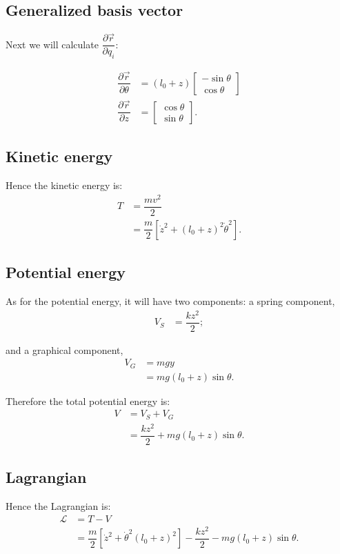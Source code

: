 \documentclass[12pt,a4paper,portrait]{article}
\begin{document}
\subsection{Generalized basis vector}
Next we will calculate $\dfrac{\partial \vec{r}}{\partial q_i}$:

\begin{align*}
	\dfrac{\partial \vec{r}}{\partial \theta} &= (l_0+z)\begin{bmatrix}
		-\sin{\theta} \\
		\cos{\theta}
	\end{bmatrix} \\
	\dfrac{\partial \vec{r}}{\partial z} &= \begin{bmatrix}
		\cos{\theta} \\
		\sin{\theta}
	\end{bmatrix}.
\end{align*}

\subsection{Kinetic energy}
Hence the kinetic energy is:
\begin{align*}
	T &= \dfrac{mv^2}{2} \\
	&= \dfrac{m}{2} \left[\dot{z}^2 + (l_0+z)^2\dot{\theta}^2\right].
\end{align*}

\subsection{Potential energy}
As for the potential energy, it will have two components: a spring component,
\begin{align*}
	V_S &= \dfrac{kz^2}{2};
\end{align*}

and a graphical component,
\begin{align*}
	V_G &= mgy \\
	&= mg(l_0+z)\sin{\theta}.
\end{align*}

Therefore the total potential energy is:
\begin{align*}
	V &= V_S + V_G \\
	&= \dfrac{kz^2}{2} + mg(l_0+z)\sin{\theta}.
\end{align*}

\subsection{Lagrangian}
Hence the Lagrangian is:
\begin{align*}
	\mathcal{L} &= T - V \\
	&= \dfrac{m}{2} \left[\dot{z}^2 + \dot{\theta}^2(l_0+z)^2\right] - \dfrac{kz^2}{2} - mg(l_0+z)\sin{\theta}.
\end{align*}
\end{document}
